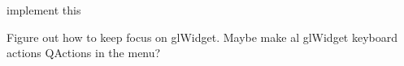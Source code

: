 
\begin{DoxyRefList}
\item[\label{task__task000001}%
\hypertarget{task__task000001}{}%
Member \hyperlink{classBixelGrid_a2f45709d9159599eb3af5ceed54fc550aa9b97045f133062453e585409323d940}{Bixel\-Grid\-:\-:P\-A\-I\-N\-T\-B\-U\-C\-K\-E\-T} ]implement this  
\item[\label{task__task000002}%
\hypertarget{task__task000002}{}%
Class \hyperlink{classBixelWindow}{Bixel\-Window} ]Figure out how to keep focus on gl\-Widget. Maybe make al gl\-Widget keyboard actions Q\-Actions in the menu? 
\end{DoxyRefList}